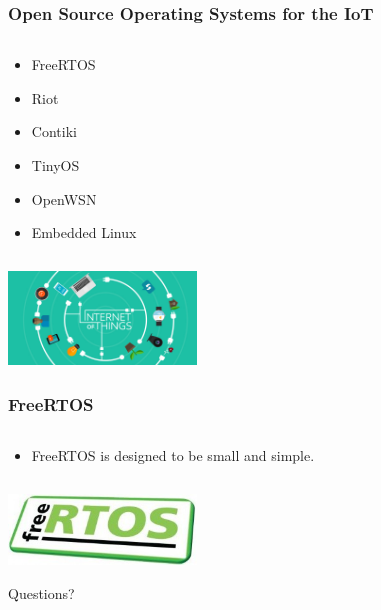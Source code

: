 \documentclass{beamer}
\begin{document}
\begin{frame}
	\frametitle{Open Source Operating Systems for the IoT}
	\begin{columns}[c]
		\begin{column}{30cm}
			\vspace{.1cm}
			\begin{itemize}
				\justifying
				\item FreeRTOS
				\item Riot
				\item Contiki
				\item TinyOS
				\item OpenWSN
				\item Embedded Linux
			\end{itemize}
		\end{column}
	\end{columns}
	\vspace{.5cm}
	\hspace*{5.5cm} \includegraphics[width=5cm]{figs/Internet-of-Things-2.jpg}
\end{frame}

\begin{frame}
	\frametitle{FreeRTOS}
	\begin{columns}[c]
		\begin{column}{30cm}
			\vspace{.1cm}
			\begin{itemize}
				\justifying
				\item FreeRTOS is designed to be small and simple.
			\end{itemize}
		\end{column}
	\end{columns}
	\vspace{.5cm}
	\hspace*{5.5cm} \includegraphics[width=5cm]{figs/freertos-logo.jpg}	
\end{frame}

\begin{frame}
	\vspace{1cm}
	\begin{Huge}
		\begin{center}
			Questions?
		\end{center}
	\end{Huge}
\end{frame}
\end{document}
